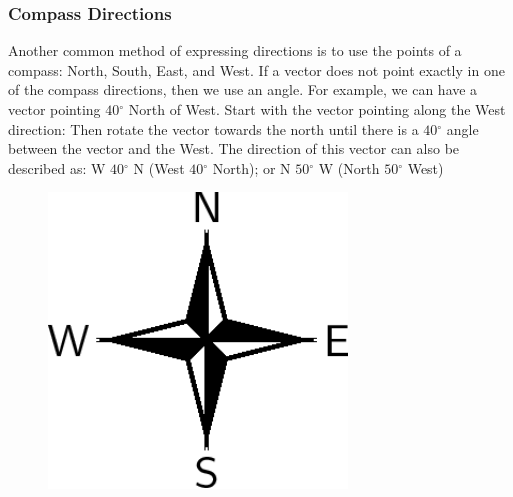       \label{m38812*uid6}
            \subsubsection{ Compass Directions}
            \nopagebreak
            
        
        \label{m38812*id187246}Another common method of expressing directions is to use the points of a compass: North, South, East, and West.
If a vector does not point exactly in one of the compass directions, then we use an angle. For example, we can have a vector pointing \begin{math}40{}^{\circ }\end{math} North of West. Start with the vector pointing along the West direction:
Then rotate the vector towards the north until there is a \begin{math}40{}^{\circ }\end{math} angle between the vector and the West.
The direction of this vector can also be described as: W \begin{math}40{}^{\circ }\end{math} N (West \begin{math}40{}^{\circ }\end{math} North); or N \begin{math}50{}^{\circ }\end{math} W (North \begin{math}50{}^{\circ }\end{math} West)




    \setcounter{subfigure}{0}


	\begin{figure}[H] %
    \begin{center}
    \label{m38812*id187349!!!underscore!!!media}\label{m38812*id187349!!!underscore!!!printimage}\includegraphics[width=300px]{col11305.imgs/m38812_PG11C1_003.png} %
        
      \vspace{2pt}
    \vspace{.1in}
    
    \end{center}

 \end{figure}   

